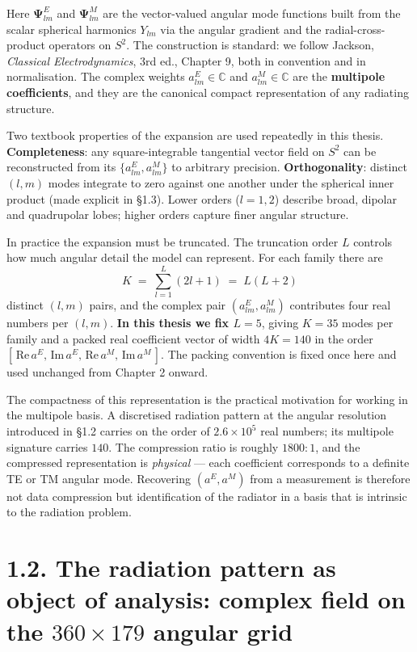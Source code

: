 \documentclass[
  english,
  11pt,
]{report}
\begin{document}
Here \(\boldsymbol{\Psi}^E_{lm}\) and \(\boldsymbol{\Psi}^M_{lm}\) are
the vector-valued angular mode functions built from the scalar spherical
harmonics \(Y_{lm}\) via the angular gradient and the
radial-cross-product operators on \(S^2\). The construction is standard:
we follow Jackson, \emph{Classical Electrodynamics}, 3rd ed., Chapter 9,
both in convention and in normalisation. The complex weights
\(a^E_{lm}\in\mathbb{C}\) and \(a^M_{lm}\in\mathbb{C}\) are the
\textbf{multipole coefficients}, and they are the canonical compact
representation of any radiating structure.

Two textbook properties of the expansion are used repeatedly in this
thesis. \textbf{Completeness}: any square-integrable tangential vector
field on \(S^2\) can be reconstructed from its
\(\{a^E_{lm}, a^M_{lm}\}\) to arbitrary precision.
\textbf{Orthogonality}: distinct \((l,m)\) modes integrate to zero
against one another under the spherical inner product (made explicit in
§1.3). Lower orders (\(l=1, 2\)) describe broad, dipolar and quadrupolar
lobes; higher orders capture finer angular structure.

In practice the expansion must be truncated. The truncation order \(L\)
controls how much angular detail the model can represent. For each
family there are \[
K \;=\; \sum_{l=1}^{L}(2l+1) \;=\; L(L+2)
\] distinct \((l,m)\) pairs, and the complex pair
\((a^E_{lm}, a^M_{lm})\) contributes four real numbers per \((l,m)\).
\textbf{In this thesis we fix \(L=5\)}, giving \(K=35\) modes per family
and a packed real coefficient vector of width \(4K=140\) in the order
\([\,\mathrm{Re}\,a^E,\,\mathrm{Im}\,a^E,\,\mathrm{Re}\,a^M,\,\mathrm{Im}\,a^M\,]\).
The packing convention is fixed once here and used unchanged from
Chapter 2 onward.

The compactness of this representation is the practical motivation for
working in the multipole basis. A discretised radiation pattern at the
angular resolution introduced in §1.2 carries on the order of
\(2.6\times 10^5\) real numbers; its multipole signature carries
\(140\). The compression ratio is roughly \(1800{:}1\), and the
compressed representation is \emph{physical} --- each coefficient
corresponds to a definite TE or TM angular mode. Recovering
\((a^E, a^M)\) from a measurement is therefore not data compression but
identification of the radiator in a basis that is intrinsic to the
radiation problem.

\section{\texorpdfstring{1.2. The radiation pattern as object of
analysis: complex field on the \(360 \times 179\) angular
grid}{1.2. The radiation pattern as object of analysis: complex field on the 360 \textbackslash times 179 angular grid}}\label{the-radiation-pattern-as-object-of-analysis-complex-field-on-the-360-times-179-angular-grid}
\end{document}
